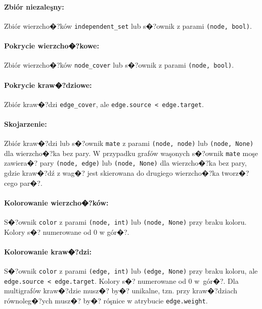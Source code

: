 \documentclass[12pt,a4paper]{mwrep}
\begin{document}
\paragraph{Zbiór niezaleşny:} Zbiór wierzcho�?ków \lstinline|independent_set|
lub s�?ownik z parami \lstinline|(node, bool)|.

\paragraph{Pokrycie wierzcho�?kowe:} Zbiór wierzcho�?ków \lstinline|node_cover|
lub s�?ownik z parami \lstinline|(node, bool)|.

\paragraph{Pokrycie kraw�?dziowe:} Zbiór kraw�?dzi \lstinline|edge_cover|,
ale \lstinline|edge.source < edge.target|.

\paragraph{Skojarzenie:} Zbiór kraw�?dzi lub s�?ownik \lstinline|mate|
z parami \lstinline|(node, node)| lub \lstinline|(node, None)|
dla wierzcho�?ka bez pary.
W przypadku grafów waşonych s�?ownik \lstinline|mate|
moşe zawiera�? pary \lstinline|(node, edge)| lub \lstinline|(node, None)|
dla wierzcho�?ka bez pary, gdzie kraw�?dź z wag�? jest skierowana
do drugiego wierzcho�?ka tworz�?cego par�?.

\paragraph{Kolorowanie wierzcho�?ków:} S�?ownik \lstinline|color|
z parami \lstinline|(node, int)| lub \lstinline|(node, None)|
przy braku koloru. Kolory s�? numerowane od 0 w gór�?.

\paragraph{Kolorowanie kraw�?dzi:} S�?ownik \lstinline|color|
z parami \lstinline|(edge, int)| lub \lstinline|(edge, None)|
przy braku koloru, ale \lstinline|edge.source < edge.target|.
Kolory s�? numerowane od 0 w~gór�?.
Dla multigrafów kraw�?dzie musz�? by�? unikalne, tzn. przy kraw�?dziach
równoleg�?ych musz�? by�? róşnice w atrybucie \lstinline|edge.weight|.

\end{document}
